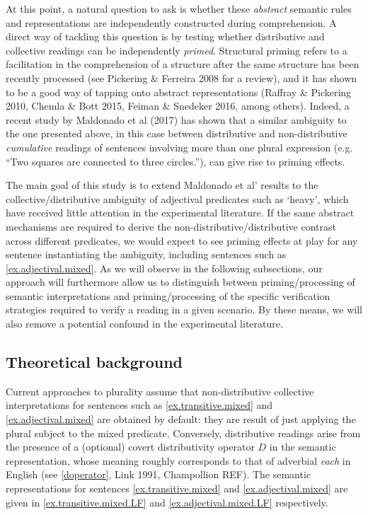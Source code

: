 \documentclass[a4paper, 11pt]{article}
\begin{document}
At this point, a natural question to ask is whether these \emph{abstract} semantic rules and representations are independently constructed during comprehension. A direct way of tackling this question is by testing whether distributive and collective readings can be independently \emph{primed}.  Structural priming refers to a facilitation in the comprehension of a structure after the same structure has been recently processed (see Pickering \& Ferreira 2008 for a review), and it has shown to be a good way of tapping onto abstract representations (Raffray \& Pickering 2010, Chemla \& Bott 2015, Feiman \& Snedeker 2016, among others). 
Indeed, a recent study by Maldonado et al (2017) has shown that a similar ambiguity to the one presented above, in this case between distributive and non-distributive \emph{cumulative} readings of sentences involving more than one plural expression (e.g. ``Two squares are connected to three circles.''), can give rise to priming effects.

The main goal of this study is to extend Maldonado et al' results to the collective/distributive ambiguity of adjectival predicates such as `heavy', which have received little attention in the experimental literature. If the same abstract mechanisms are required to derive the non-distributive/distributive contrast across different predicates, we would expect to see priming effects at play for any sentence instantiating the ambiguity, including sentences such as \ref{ex.adjectival.mixed}.
As we will observe in the following subsections, our approach will furthermore allow us to distinguish between priming/processing of semantic interpretations and priming/processing of the specific verification strategies required to verify a reading in a given scenario. By these means, we will also remove a potential confound in the experimental literature. 

\subsection{Theoretical background}
Current approaches to plurality assume that non-distributive collective interpretations for sentences such as \ref{ex.transitive.mixed} and \ref{ex.adjectival.mixed} are obtained by default: they are result of just applying the plural subject to the mixed predicate. 
Conversely, distributive readings arise from the presence of a (optional) covert distributivity operator $D$ in the semantic representation, whose meaning roughly corresponds to that of adverbial \textit{each} in English (see \ref{doperator}, Link 1991, Champollion REF). The semantic representations for sentences  \ref{ex.transitive.mixed} and \ref{ex.adjectival.mixed} are given in \ref{ex.transitive.mixed.LF} and \ref{ex.adjectival.mixed.LF} respectively. 
\end{document}
